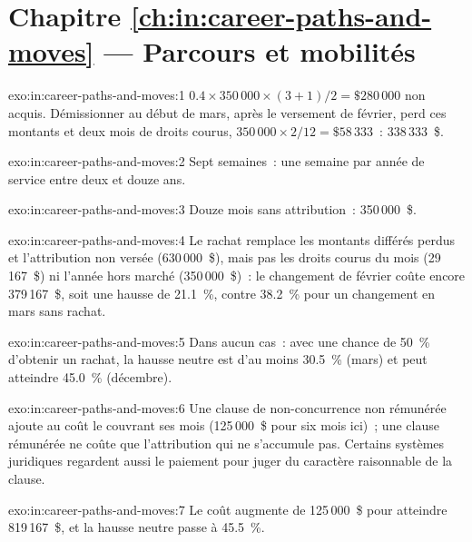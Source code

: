 \section*{Chapitre \ref{ch:in:career-paths-and-moves} --- Parcours et mobilités}

\begin{solution}{exo:in:career-paths-and-moves:1}
$0.4\times350\,000\times(3+1)/2=\$280\,000$ non acquis. Démissionner au début de mars, après le versement de février,
perd ces montants et deux mois de droits courus, $350\,000\times2/12=\$58\,333$~: 338\,333~\$.
\end{solution}

\begin{solution}{exo:in:career-paths-and-moves:2}
Sept semaines~: une semaine par année de service entre deux et douze ans.
\end{solution}

\begin{solution}{exo:in:career-paths-and-moves:3}
Douze mois sans attribution~: 350\,000~\$.
\end{solution}

\begin{solution}{exo:in:career-paths-and-moves:4}
Le rachat remplace les montants différés perdus et l'attribution non versée (630\,000~\$), mais pas les droits courus du mois
(29\,167~\$) ni l'année hors marché (350\,000~\$)~: le changement de février coûte encore 379\,167~\$, soit une hausse de 21.1~\%,
contre 38.2~\% pour un changement en mars sans rachat.
\end{solution}

\begin{solution}{exo:in:career-paths-and-moves:5}
Dans aucun cas~: avec une chance de 50~\% d'obtenir un rachat, la hausse neutre est d'au moins 30.5~\% (mars) et peut atteindre 45.0~\% (décembre).
\end{solution}

\begin{solution}{exo:in:career-paths-and-moves:6}
Une clause de non-concurrence non rémunérée ajoute au coût le  couvrant ses mois (125\,000~\$ pour six mois ici)~; une clause rémunérée ne coûte que
l'attribution qui ne s'accumule pas. Certains systèmes juridiques regardent aussi le paiement pour juger du caractère raisonnable de la clause.
\end{solution}

\begin{solution}{exo:in:career-paths-and-moves:7}
Le coût augmente de 125\,000~\$ pour atteindre 819\,167~\$, et la hausse neutre passe à 45.5~\%.
\end{solution}

